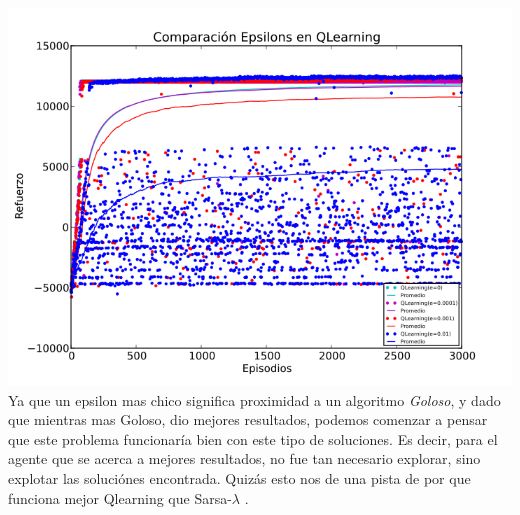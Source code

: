 \documentclass[11pt, a4paper]{article}
\newcommand{\slambda}{Sarsa-$\lambda$ }
\begin{document}
\includegraphics[scale=0.6]{Graf2}
Ya que un epsilon mas chico significa proximidad a un algoritmo \textit{Goloso}, y dado que mientras mas Goloso, dio mejores resultados, podemos comenzar a pensar que este problema funcionar\'ia bien con este tipo de soluciones. 
Es decir, para el agente que se acerca a mejores resultados, no fue tan necesario explorar, sino explotar las soluci\'ones encontrada. Quiz\'as esto nos de una pista de por que funciona mejor Qlearning que \slambda.
\end{document}
